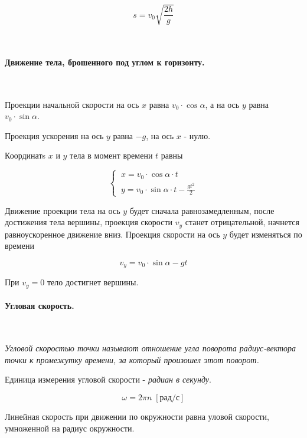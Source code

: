 \documentclass[a4paper,12pt]{article}
\begin{document}
		\begin{equation*}
			s = v_0\sqrt{\frac{2h}{g}}	
		\end{equation*}

		\

		\paragraph*{Движение тела, брошенного под углом к горизонту.} \

		Проекции начальной скорости на ось $x$ равна $v_0 \cdot \cos \alpha$, а на ось $y$ равна
		$v_0 \cdot \sin \alpha$. 
		
		Проекция ускорения на ось $y$ равна $-g$, на ось $x$ - нулю.

		Координатs $x$ и $y$ тела в момент времени $t$ равны

		\begin{equation*}
			\begin{cases}
				\ x = v_0 \cdot \cos \alpha \cdot t \\
				\ y = v_0 \cdot \sin \alpha \cdot t - \frac{gt^2}{2}
			\end{cases}
		\end{equation*}
		
		Движение проекции тела на ось $y$ будет сначала равнозамедленным, после достижения тела
		вершины, проекция скорости $v_y$ станет отрицательной, начнется равноускоренное движение 
		вниз. Проекция скорости на ось $y$ будет изменяться по времени
		
		\begin{equation*}
			v_y = v_0 \cdot \sin \alpha - gt
		\end{equation*}

		При $v_y = 0$ тело достигнет вершины.

		\paragraph{Угловая скорость.} \

		\textit{Угловой скоростью точки называют отношение угла поворота радиус-вектора точки к
		промежутку времени, за который произошел этот поворот.}

		Единица измерения угловой скорости - \textit{радиан в секунду}.

		\begin{equation}
			\omega = 2 \pi n \; [\text{рад/с}]
		\end{equation}

		Линейная скорость при движении по окружности равна уловой скорости, умноженной
		на радиус окружности.
		
\end{document}
